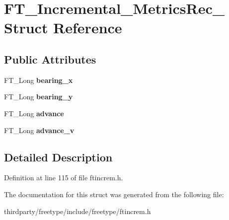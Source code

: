 \hypertarget{struct_f_t___incremental___metrics_rec__}{}\section{F\+T\+\_\+\+Incremental\+\_\+\+Metrics\+Rec\+\_\+ Struct Reference}
\label{struct_f_t___incremental___metrics_rec__}
\subsection*{Public Attributes}
\begin{DoxyCompactItemize}
\item 
\mbox{\label{struct_f_t___incremental___metrics_rec___af065d998d0a0f2a57513125038d802a6}} 
F\+T\+\_\+\+Long {\bfseries bearing\+\_\+x}
\item 
\mbox{\label{struct_f_t___incremental___metrics_rec___af1443aa7c1ca54d3c2a29f1cf6d7848b}} 
F\+T\+\_\+\+Long {\bfseries bearing\+\_\+y}
\item 
\mbox{\label{struct_f_t___incremental___metrics_rec___a996c99aa0e6b36c2c7776fc1a2b6b614}} 
F\+T\+\_\+\+Long {\bfseries advance}
\item 
\mbox{\label{struct_f_t___incremental___metrics_rec___a0ee280662a03ea935dbfe377e56f4d6d}} 
F\+T\+\_\+\+Long {\bfseries advance\+\_\+v}
\end{DoxyCompactItemize}


\subsection{Detailed Description}


Definition at line 115 of file ftincrem.\+h.



The documentation for this struct was generated from the following file\+:\begin{DoxyCompactItemize}
\item 
thirdparty/freetype/include/freetype/ftincrem.\+h\end{DoxyCompactItemize}
